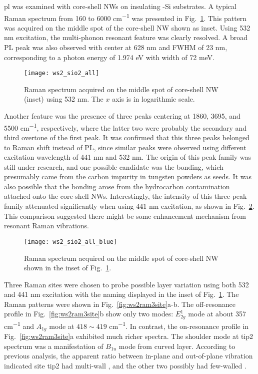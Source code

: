 \Gls{pl} was examined with core-shell NWs on insulating -Si substrates. A typical Raman spectrum from 160 to 6000 \si{cm^{-1}} was presented in Fig.~\ref{fig:ws2ramall}. This pattern was acquired on the middle spot of the core-shell NW shown as inset. Using 532 nm excitation, the multi-phonon resonant feature was clearly resolved. A broad PL peak was also observed with center at 628 nm and FWHM of 23 nm, corresponding to a photon energy of 1.974 eV with width of 72 meV.  
\begin{figure}[htb]
\centering
\texttt{[image: ws2\_sio2\_all]}
\caption[Raman spectrum on the middle spot of core-shell NW]{Raman spectrum acquired on the middle spot of core-shell NW (inset) using 532 nm. The $x$ axis is in logarithmic scale.}
\label{fig:ws2ramall}
\end{figure}
Another feature was the presence of three peaks centering at 1860, 3695, and 5500 \si{cm^{-1}}, respectively, where the latter two were probably the secondary and third overtone of the first peak. It was confirmed that this three peaks belonged to Raman shift instead of PL, since similar peaks were observed using different excitation wavelength of 441 nm and 532 nm. The origin of this peak family was still under research, and one possible candidate was the  bonding, which presumably came from the carbon impurity in tungsten powders as seeds. It was also possible that the  bonding arose from the hydrocarbon contamination attached onto the core-shell NWs. Interestingly, the intensity of this three-peak family attenuated significantly when using 441 nm excitation, as shown in Fig.~\ref{fig:ws2ramblue}. This comparison suggested there might be some enhancement mechanism from  resonant Raman vibrations. 
\begin{figure}[htb]
\centering
\texttt{[image: ws2\_sio2\_all\_blue]}
\caption[Raman spectrum acquired on the middle spot]{Raman spectrum acquired on the middle spot of core-shell NW shown in the inset of Fig.~\ref{fig:ws2ramall}.}
\label{fig:ws2ramblue}
\end{figure}
Three Raman sites were chosen to probe possible layer variation using both 532 and 441 nm excitation with the naming displayed in the inset of Fig.~\ref{fig:ws2ramall}. The Raman patterns were shown in Fig.~\ref{fig:ws2ram3site}a-b. The off-resonance profile in Fig.~\ref{fig:ws2ram3site}b show only two modes: $E_{2g}^1$ mode at about 357 \si{cm^{-1}} and $A_{1g}$ mode at $418\sim419$ \si{cm^{-1}}. In contrast, the on-resonance profile in Fig.~\ref{fig:ws2ram3site}a exhibited much richer spectra. The shoulder mode at tip2 spectrum was a manifestation of $B_{1u}$ mode from curved  layer. According to previous analysis, the apparent ratio between in-plane and out-of-plane vibration indicated site tip2 had multi-wall , and the other two possibly had few-walled . 
